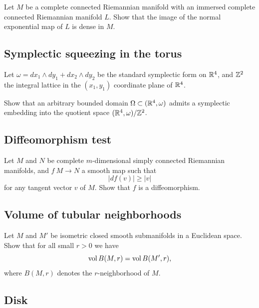 \begin{pr}
Let $M$ be a complete connected Riemannian manifold
with an immersed complete connected Riemannian manifold $L$.
Show that the image  of the 
normal exponential map of $L$ is dense in $M$.
\end{pr}

\subsection*{Symplectic squeezing in the torus}
\label{Symplectic squeezing in the torus}



\begin{pr}
Let 
$\omega=dx_1\wedge dy_1+ dx_2\wedge dy_2$
be the standard symplectic form on $\mathbb{R}^4$, and $\mathbb{Z}^2$ the integral lattice in the $(x_1,y_1)$ coordinate plane of $\mathbb{R}^4$.

Show that an arbitrary bounded domain $\Omega\subset (\mathbb{R}^4,\omega)$
admits a symplectic embedding into the quotient space $(\mathbb{R}^4,\omega)/\mathbb{Z}^2$. 
\end{pr}

\subsection*{Diffeomorphism test\easy}
\label{Diffeomorphism test}


\begin{pr}
Let $M$ and $N$ be complete $m$-dimensional simply connected Riemannian manifolds, and $f\:M\to N$ a smooth map such that 
$$|df(v)|\ge |v|$$
for any tangent vector $v$ of $M$.
Show that $f$ is a diffeomorphism.
\end{pr}

\subsection*{Volume of tubular neighborhoods\thm}
\label{Volume of tubular neighborhoods}

\begin{pr}
Let $M$ and $M'$ be isometric closed smooth submanifolds in a Euclidean space.
Show that for all small $r>0$ we have
$$\operatorname{\rm vol}\nolimits B(M,r)=\operatorname{\rm vol}\nolimits B(M',r),$$
where $B(M,r)$ denotes the $r$-neighborhood of $M$.
\end{pr}

\subsection*{Disk\hard}
\label{disk}

